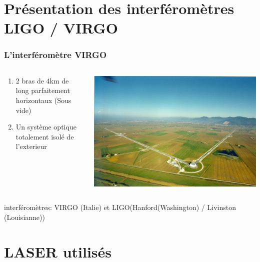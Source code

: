\documentclass{beamer}
\begin{document}
\section{Présentation des interféromètres LIGO / VIRGO}
\begin{frame}
	\frametitle{L'interféromètre VIRGO}
	\begin{columns}
		\begin{column}{0.5\textwidth}
			\small
			\begin{enumerate}[-]
				\item 2 bras de 4km de long parfaitement horizontaux (Sous vide)
				\item Un système optique  totalement isolé de l'exterieur
			\end{enumerate}
		\end{column}
		\begin{column}{0.5\textwidth}
			\includegraphics[scale=.5]{Docs/virgoview.png}
		\end{column}
	\end{columns}
	 interféromètres: VIRGO (Italie) et LIGO(Hanford(Washington) / Livinston (Louisianne))
\end{frame}
\section{LASER utilisés}
\end{document}
